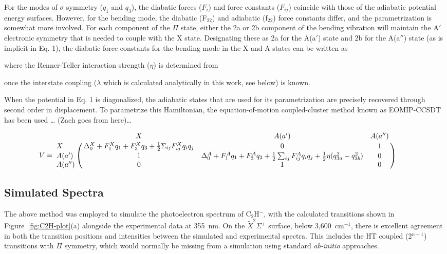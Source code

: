 \documentclass[journal=jpcafh,manuscript=article,layout=onecolumn, 12pt]{achemso}
\begin{document}
For the modes of $\sigma$ symmetry ($q_1$ and $q_3$), the diabatic forces ($F_i$) and force constants ($F_{ij}$) coincide with those of the adiabatic potential energy surfaces.   However, for the bending mode, the diabatic (F$_{22}$) and adiabatic (f$_{22}$) force constants differ, and the parametrization is somewhat more involved.   For each component of the $\Pi$ state, either the 2a or 2b component of the bending vibration will maintain the A$'$ electronic symmetry that is needed to couple with the X state.  Designating these as 2a for the A(a$'$) state and 2b for the A(a$''$) state (as is implicit in Eq. 1), the diabatic force constants for the bending mode in the X and A states can be written as 

where the Renner-Teller interaction strength ($\eta$) is determined from 

once the interstate coupling ($\lambda$ which is calculated analytically in this work, see below) is known.

When the potential in Eq. 1 is diagonalized, the adiabatic states that are used for its parametrization are precisely recovered through second order in displacement. To parametrize this Hamiltonian, the equation-of-motion coupled-cluster method known as EOMIP-CCSDT has been used … (Zach goes from here)…



\begin{equation}
V = \bordermatrix{ & X & A(a') & A(a'') \cr
	X &{\Delta_0^X+F_1^Xq_1+F_3^Xq_3+ 
		\frac{1}{2} \Sigma_{ij}F^X_{ij}q_iq_j}& 0 & 1 \cr
	A(a') & 1 & \Delta^A_0+F^A_1q_1+F^A_3q_3+\frac{1}{2}\sum_{ij}F^A_{ij}q_iq_j+\frac{1}{2}\eta(q_{3a}^2-q_{3b}^2) & 0 \cr
	A(a'') & 0 & 1 & 0 } \qquad
\end{equation}

\subsection{Simulated Spectra}
The above method was employed to simulate the photoelectron spectrum of C$_2$H$^-$, with the calculated transitions shown in Figure~\ref{fig:C2H-plot}(a) alongside the experimental data at 355~nm. %
On the $\tilde{X} ^2\Sigma^+$ surface, below 3,600~cm$^{-1}$, there is excellent agreement in both the transition positions and intensities between the simulated and experimental spectra. This includes the HT coupled (2$^{n+1}$) transitions with $\Pi$ symmetry, which would normally be missing from a simulation using standard \emph{ab-initio} approaches. 
\end{document}
